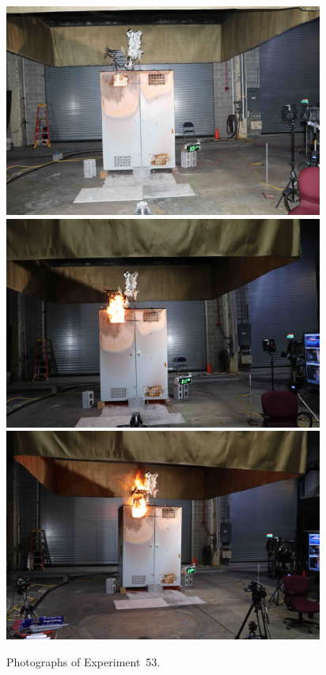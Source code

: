 \documentclass[12pt]{article}
\begin{document}
\begin{figure}[p]
\centering
\includegraphics[height=2.75in]{../FIGURES/Test_53_5_min_24_s} \\
\includegraphics[height=2.75in]{../FIGURES/Test_53_11_min_45_s} \\
\includegraphics[height=2.75in]{../FIGURES/Test_53_ignition}
\caption[Photographs of Experiment~53]{Photographs of Experiment~53.}
\label{fig:Test_53_photos}
\end{figure}


\clearpage
\end{document}
